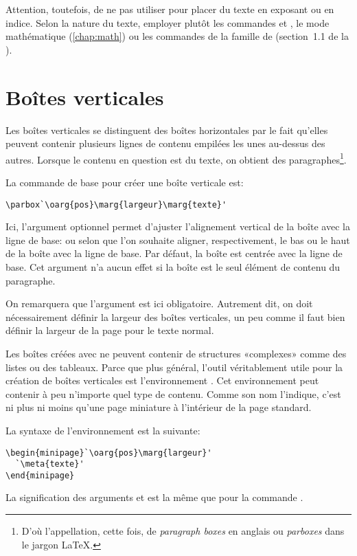 Attention, toutefois, de ne pas utiliser \cmd{\raisebox} pour placer
du texte en exposant ou en indice. Selon la nature du texte, employer
plutôt les commandes \cmd{\textsuperscript} et \cmd{\textsubscript},
le mode mathématique (\autoref{chap:math}) ou les commandes de la
famille \cmd{\ieme} de  (section~1.1 de la %
).

\section{Boîtes verticales}
\label{sec:boites:parbox}

Les boîtes verticales se distinguent des boîtes horizontales par le
fait qu'elles peuvent contenir plusieurs lignes de contenu empilées
les unes au-dessus des autres. Lorsque le contenu en question est du
texte, on obtient des paragraphes\footnote{%
  D'où l'appellation, cette fois, de \emph{paragraph boxes} en anglais
  ou \emph{parboxes} dans le jargon {\LaTeX}.}. %

La commande de base pour créer une boîte verticale est:
\begin{lstlisting}
\parbox`\oarg{pos}\marg{largeur}\marg{texte}'
\end{lstlisting}
Ici, l'argument optionnel  permet d'ajuster l'alignement
vertical de la boîte avec la ligne de base:  ou  selon
que l'on souhaite aligner, respectivement, le bas ou le haut de la
boîte avec la ligne de base. Par défaut, la boîte est centrée avec la
ligne de base. Cet argument n'a aucun effet si la boîte est le seul
élément de contenu du paragraphe.

On remarquera que l'argument  est ici obligatoire.
Autrement dit, on doit nécessairement définir la largeur des boîtes
verticales, un peu comme il faut bien définir la largeur de la page
pour le texte normal.

Les boîtes créées avec \cmd{\parbox} ne peuvent contenir de structures
«complexes» comme des listes ou des tableaux. Parce que plus général,
l'outil véritablement utile pour la création de boîtes verticales est
l'environnement . Cet environnement peut contenir à peu
n'importe quel type de contenu. Comme son nom l'indique, c'est ni plus
ni moins qu'une page miniature à l'intérieur de la page standard.

La syntaxe de l'environnement  est la suivante:
\begin{lstlisting}
\begin{minipage}`\oarg{pos}\marg{largeur}'
  `\meta{texte}'
\end{minipage}
\end{lstlisting}
La signification des arguments  et  est la
même que pour la commande .

